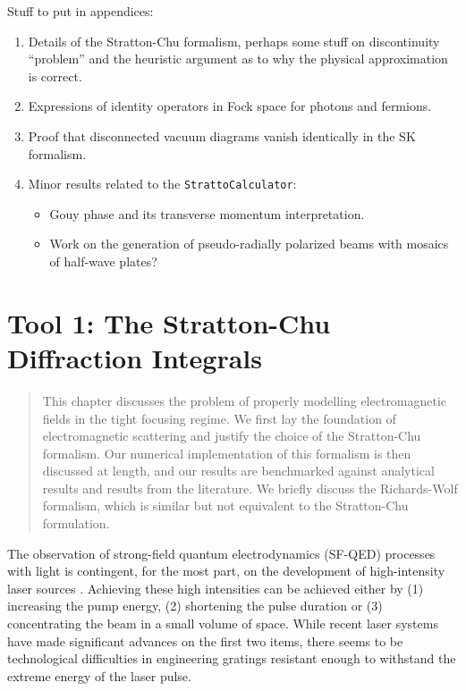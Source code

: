 \documentclass[11pt,SymmetricalJury]{inrsthesis/inrsthesis}
\newenvironment{chaptersummary}{%
  \begin{quotation}
  \SingleSpacing
  \setlength{\parskip}{\baselineskip}}{%
  \end{quotation}}
\begin{document}
Stuff to put in appendices:
  \begin{enumerate}
    \item Details of the Stratton-Chu formalism, perhaps some stuff on
          discontinuity ``problem'' \cite{Asvestas1980} and the heuristic argument as to why
          the physical approximation is correct.
    \item Expressions of identity operators in Fock space for photons and fermions.
    \item Proof that disconnected vacuum diagrams vanish identically in the SK formalism.
    \item Minor results related to the \texttt{StrattoCalculator}:
      \begin{itemize}
        \item Gouy phase and its transverse momentum interpretation.
        \item Work on the generation of pseudo-radially polarized beams with mosaics of half-wave plates?
      \end{itemize}
  \end{enumerate}

\chapter{Tool 1: The Stratton-Chu Diffraction Integrals}
\label{chapter:stratton-chu}

\begin{chaptersummary}
This chapter discusses the problem of properly modelling electromagnetic fields
in the tight focusing regime. We first lay the foundation of electromagnetic
scattering and justify the choice of the Stratton-Chu formalism. Our numerical
implementation of this formalism is then discussed at length, and our results
are benchmarked against analytical results and results from the literature.
We briefly discuss the Richards-Wolf formalism, which is similar but not equivalent
to the Stratton-Chu formulation.
\end{chaptersummary}

The observation of strong-field quantum electrodynamics (SF-QED) processes with light
is contingent, for the most part, on the development of high-intensity laser sources \cite{DiPiazza2012}. Achieving
these high intensities can be achieved either by (1) increasing the pump energy,
(2) shortening the pulse duration or (3) concentrating the beam in a small volume of space.
While recent laser systems have made significant advances on the first two items, there seems
to be technological difficulties in engineering gratings resistant enough to withstand the extreme
energy of the laser pulse.
\end{document}
